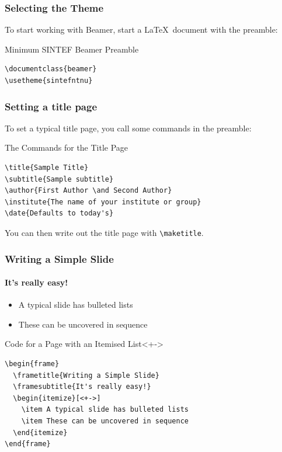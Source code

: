 \documentclass{beamer}
\begin{document}
\begin{frame}[fragile]
\frametitle{Selecting the Theme}
To start working with Beamer, start a \LaTeX\ document with the
preamble:
\begin{block}{Minimum SINTEF Beamer Preamble}
\begin{verbatim}
\documentclass{beamer}
\usetheme{sintefntnu}\end{verbatim}
\end{block}
\end{frame}

\begin{frame}[fragile]
\frametitle{Setting a title page}
To set a typical title page, you call some commands in the preamble:
\begin{block}{The Commands for the Title Page}
\begin{verbatim}
\title{Sample Title}
\subtitle{Sample subtitle}
\author{First Author \and Second Author}
\institute{The name of your institute or group}
\date{Defaults to today's}
\end{verbatim}
\end{block}
You can then write out the title page with \verb|\maketitle|.
\end{frame}

\begin{frame}[fragile]
\frametitle{Writing a Simple Slide}
\framesubtitle{It's really easy!}
\begin{itemize}[<+->]
\item A typical slide has bulleted lists
\item These can be uncovered in sequence
\end{itemize}
\begin{block}{Code for a Page with an Itemised List}<+->
\begin{verbatim}
\begin{frame}
  \frametitle{Writing a Simple Slide}
  \framesubtitle{It's really easy!}
  \begin{itemize}[<+->]
    \item A typical slide has bulleted lists
    \item These can be uncovered in sequence
  \end{itemize}
\end{frame}\end{verbatim}
\end{block}
\end{frame}
\end{document}
